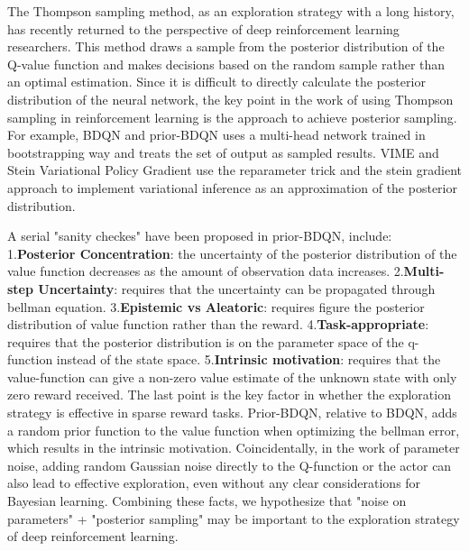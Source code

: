 The Thompson sampling method, as an exploration strategy with a long history, has recently returned to the perspective of deep reinforcement learning researchers. This method draws a sample from the posterior distribution of the Q-value function and makes decisions based on the random sample rather than an optimal estimation. Since it is difficult to directly calculate the posterior distribution of the neural network, the key point in the work of using Thompson sampling in reinforcement learning is the approach to achieve posterior sampling. For example, BDQN \cite{BDQN} and prior-BDQN \cite{osband2018randomized} uses a multi-head network trained in bootstrapping way and treats the set of output as sampled results. VIME \cite{VIME} and Stein Variational Policy Gradient \cite{liu2017stein} use the reparameter trick and the stein gradient approach to implement variational inference as an approximation of the posterior distribution. 

A serial "sanity checkes" have been proposed in prior-BDQN, include: 1.\textbf{Posterior Concentration}: the uncertainty of the posterior distribution of the value function decreases as the amount of observation data increases. 2.\textbf{Multi-step Uncertainty}: requires that the uncertainty can be propagated through bellman equation. 3.\textbf{Epistemic vs Aleatoric}: requires figure the posterior distribution of value function rather than the reward. 4.\textbf{Task-appropriate}: requires that the posterior distribution is on the parameter space of the q-function instead of the state space. 5.\textbf{Intrinsic motivation}: requires that the value-function can give a non-zero value estimate of the unknown state with only zero reward received. The last point is the key factor in whether the exploration strategy is effective in sparse reward tasks. Prior-BDQN, relative to BDQN, adds a random prior function to the value function when optimizing the bellman error, which results in the intrinsic motivation. Coincidentally, in the work of parameter noise, adding random Gaussian noise directly to the Q-function or the actor can also lead to effective exploration, even without any clear considerations for Bayesian learning. Combining these facts, we hypothesize that "noise on parameters" + "posterior sampling" may be important to the exploration strategy of deep reinforcement learning.